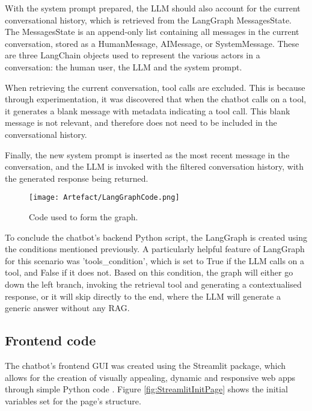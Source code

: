 \noindent With the system prompt prepared, the LLM should also account for the current conversational 
history, which is retrieved from the LangGraph MessagesState. The MessagesState is an append-only list 
containing all messages in the current conversation, stored as a HumanMessage, AIMessage, or SystemMessage.
These are three LangChain objects used to represent the various actors in a conversation: the human user,
the LLM and the system prompt.

\para When retrieving the current conversation, tool calls are excluded. This is because through experimentation,
it was discovered that when the chatbot calls on a tool, it generates a blank message with metadata indicating a
tool call. This blank message is not relevant, and therefore does not need to be included in the conversational history.

\para Finally, the new system prompt is inserted as the most recent message in the conversation, and the LLM
is invoked with the filtered conversation history, with the generated response being returned.

\begin{figure}[H]
    \centering
    \texttt{[image: Artefact/LangGraphCode.png]}
    \caption{Code used to form the graph. \label{fig:LangGraphCode}}
\end{figure}

\para To conclude the chatbot's backend Python script, the LangGraph is created using the conditions mentioned 
previously. A particularly helpful feature of LangGraph for this scenario was 'tools\_condition', which is
set to True if the LLM calls on a tool, and False if it does not. Based on this condition, the graph will either 
go down the left branch, invoking the retrieval tool and generating a contextualised response, or it will skip 
directly to the end, where the LLM will generate a generic answer without any RAG.


\newpage 

\subsection{Frontend code}\label{sec:ChatbotFrontend}
The chatbot's frontend GUI was created using the Streamlit package, which allows for the creation of visually appealing, dynamic and 
responsive web apps through simple Python code \autocite{streamlitStreamlitFasterWay2021}. Figure \ref{fig:StreamlitInitPage} shows 
the initial variables set for the page's structure.

